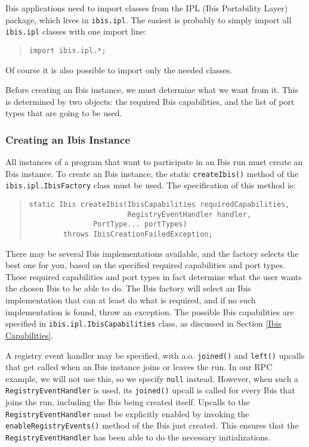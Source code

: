 \documentclass[10pt]{article}
\newcommand{\mysubsubsection}[1]{\subsubsection{#1}\label{#1}}
\begin{document}
Ibis applications need to import classes from the IPL (Ibis
Portability Layer) package, which lives in
\texttt{ibis.ipl}.
The easiest is probably to simply import all \texttt{ibis.ipl} classes with
one import line:

{\small
\begin{quote}
\begin{verbatim}
import ibis.ipl.*;
\end{verbatim}
\end{quote}
}

\noindent
Of course it is also possible to import only the needed classes.

Before creating an Ibis instance, we must determine what we want from it.
This is determined by two objects: the required Ibis capabilities, and
the list of port types that are going to be used.

\mysubsubsection{Creating an Ibis Instance}

All instances of a program that want to participate in an Ibis run
must create an Ibis instance.
To create an Ibis instance, the static \texttt{createIbis()} method of the
\texttt{ibis.ipl.IbisFactory} class must be used.
The specification of this method is:
{\small
\begin{quote}
\begin{verbatim}
static Ibis createIbis(IbisCapabilities requiredCapabilities,
                       RegistryEventHandler handler,
		       PortType... portTypes)
        throws IbisCreationFailedException;
\end{verbatim}
\end{quote}
}

There may be several Ibis implementations available, and
the factory selects the best one for you, based on the
specified required capabilities and port types.
These required capabilities and port types in fact determine what
the user wants the chosen Ibis to be able to do.
The Ibis factory will select an Ibis implementation that can at least
do what is required, and if no such implementation is found, throw an exception.
The possible Ibis capabilities are specified in
\texttt{ibis.ipl.IbisCapabilities} class, as discussed in Section
\ref{Ibis Capabilities}.

A registry event handler may be specified,
with a.o. \texttt{joined()} and \texttt{left()} upcalls that get
called when an Ibis instance joins or leaves the run.
In our RPC example, we will not use this, so we
specify \texttt{null} instead.
However, when such a \texttt{RegistryEventHandler}
is used, its \texttt{joined()} upcall is called for every Ibis that joins the
run, including the Ibis being created itself.
Upcalls to the \texttt{RegistryEventHandler} must be explicitly enabled by
invoking the \texttt{enableRegistryEvents()} method of the Ibis
just created. This ensures that the \texttt{RegistryEventHandler} has been
able to do the necessary initializations.
\end{document}
